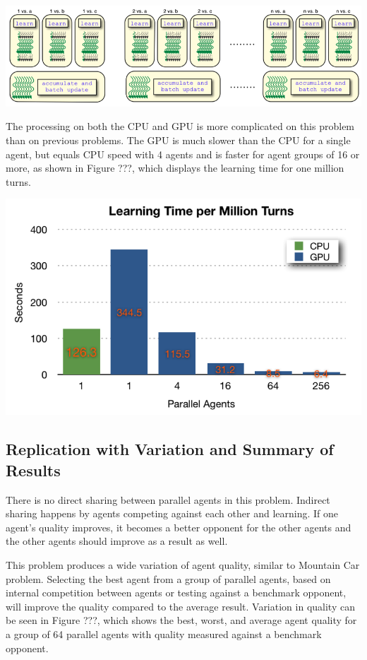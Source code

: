\documentclass[11pt]{article} %
\begin{document}
\center
\includegraphics[scale=0.8]{fig16}
\begin{flushleft}


The processing on both the CPU and GPU is more complicated on this problem than on previous problems.  The GPU is much slower than the CPU for a single agent, but equals CPU speed with 4 agents and is faster for agent groups of 16 or more, as shown in Figure ???, which displays the learning time for one million turns.

\end{flushleft}
\center
\includegraphics[scale=0.8]{fig17}
\begin{flushleft}



\subsection{Replication with Variation and Summary of Results}
There is no direct sharing between parallel agents in this problem.  Indirect sharing happens by agents competing against each other and learning.  If one agent’s quality improves, it becomes a better opponent for the other agents and the other agents should improve as a result as well.

This problem produces a wide variation of agent quality, similar to Mountain Car problem.  Selecting the best agent from a group of parallel agents, based on internal competition between agents or testing against a benchmark opponent, will improve the quality compared to the average result.  Variation in quality can be seen in Figure ???, which shows the best, worst, and average agent quality for a group of 64 parallel agents with quality measured against a benchmark opponent.

\end{flushleft}
\end{document}
